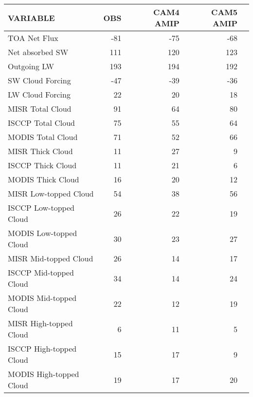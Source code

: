 \begin{tabular}{lrrrr}
\hline
                VARIABLE &                      OBS &                CAM4 AMIP &                CAM5 AMIP \\ \hline
            TOA Net Flux &                      -81 &                      -75 &                      -68 \\
         Net absorbed SW &                      111 &                      120 &                      123 \\
             Outgoing LW &                      193 &                      194 &                      192 \\
        SW Cloud Forcing &                      -47 &                      -39 &                      -36 \\
        LW Cloud Forcing &                       22 &                       20 &                       18 \\
        MISR Total Cloud &                       91 &                       64 &                       80 \\
       ISCCP Total Cloud &                       75 &                       55 &                       64 \\
       MODIS Total Cloud &                       71 &                       52 &                       66 \\
        MISR Thick Cloud &                       11 &                       27 &                        9 \\
       ISCCP Thick Cloud &                       11 &                       21 &                        6 \\
       MODIS Thick Cloud &                       16 &                       20 &                       12 \\
   MISR Low-topped Cloud &                       54 &                       38 &                       56 \\
  ISCCP Low-topped Cloud &                       26 &                       22 &                       19 \\
  MODIS Low-topped Cloud &                       30 &                       23 &                       27 \\
   MISR Mid-topped Cloud &                       26 &                       14 &                       17 \\
  ISCCP Mid-topped Cloud &                       34 &                       14 &                       24 \\
  MODIS Mid-topped Cloud &                       22 &                       12 &                       19 \\
  MISR High-topped Cloud &                        6 &                       11 &                        5 \\
 ISCCP High-topped Cloud &                       15 &                       17 &                        9 \\
 MODIS High-topped Cloud &                       19 &                       17 &                       20 \\ \hline
\end{tabular}
